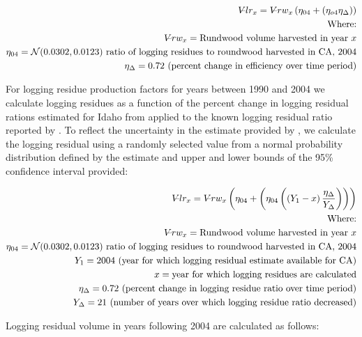 \documentclass[a4paper]{article}
\begin{document}
\begin{align*}
V\llap{--}lr_{x} = V\llap{--}rw_{x}\left(\eta_{04}+\left(\eta_{o4}\eta_\Delta\right)\right)\\
\text{Where:}\\
V\llap{--}rw_{x} = \text{Rundwood volume harvested in year }x\\
\eta_{04} = \mathcal{N}(0.0302,0.0123) \text{ ratio of logging residues to roundwood harvested in CA, 2004}\\
\eta_\Delta = 0.72 \text{ (percent change in efficiency over time period)}\\
\end{align*}

For logging residue production factors for years between 1990 and 2004 we calculate logging residues as a function of the percent change in logging residual rations estimated for Idaho from \citet{Simmons2014} applied to the known logging residual ratio reported by \citet{Morgan}. To reflect the uncertainty in the estimate provided by \citet{Morgan}, we calculate the logging residual using a randomly selected value from a normal probability distribution defined by the estimate and upper and lower bounds of the 95\% confidence interval provided:


\begin{align*}
V\llap{--}lr_{x} = V\llap{--}rw_{x}\left(\eta_{04}+ \left(\eta_{04}\left(\left(Y_1-x\right)\frac{\eta_\Delta}{Y_\Delta}\right)\right)\right)\\
\text{Where:}\\
V\llap{--}rw_{x} = \text{Rundwood volume harvested in year }x\\
\eta_{04} = \mathcal{N}(0.0302,0.0123) \text{ ratio of logging residues to roundwood harvested in CA, 2004}\\
Y_1 = 2004 \text{ (year for which logging residual estimate available for CA)} \\
x = \text{year for which logging residues are calculated}\\
\eta_\Delta = 0.72 \text{ (percent change in logging residue ratio over time period)}\\
Y_\Delta = 21\text{ (number of years over which logging residue ratio decreased)}
\end{align*}

Logging residual volume in years following 2004 are calculated as follows:
\end{document}
